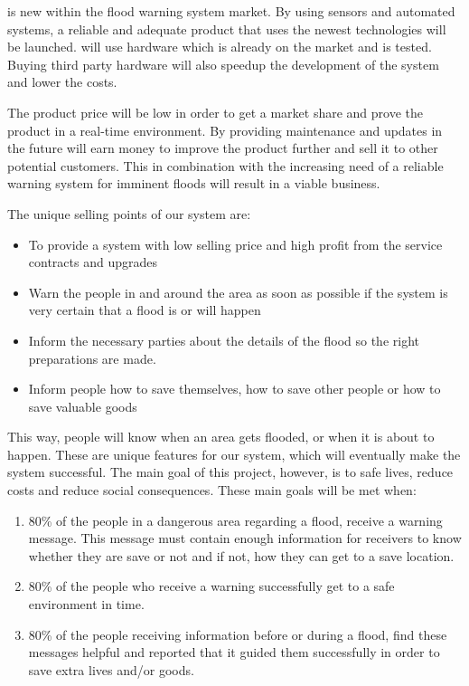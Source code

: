 \CompanyName{} is new within the flood warning system market. By using sensors and automated systems, a reliable and adequate product that uses the newest technologies will be launched. \CompanyName{} will use hardware which is already on the market and is tested. Buying third party hardware will also speedup the development of the system and lower the costs.

The product price will be low in order to get a market share and prove the product in a real-time environment. By providing maintenance and updates in the future \CompanyName{} will earn money to improve the product further and sell it to other potential customers. This in combination with the increasing need of a reliable warning system for imminent floods will result in a viable business.


The unique selling points of our system are: 
\begin{itemize}
	\item To provide a system with low selling price and high profit from the service contracts and upgrades
	\item Warn the people in and around the area as soon as possible if the system is very certain that a flood is or will happen
	\item Inform the necessary parties about the details of the flood so the right preparations are made. 
	\item Inform people how to save themselves, how to save other people or how to save valuable goods
\end{itemize}

This way, people will know when an area gets flooded, or when it is about to happen. 
These are unique features for our system, which will eventually make the system successful. The main goal of this project, however, is to safe lives, reduce costs and reduce social consequences. These main goals will be met when:
\begin{enumerate}
	\item 80\% of the people in a dangerous area regarding a flood, receive a warning message. This message must contain enough information for receivers to know whether they are save or not and if not, how they can get to a save location.
	\item 80\% of the people who receive a warning successfully get to a safe environment in time.
	\item 80\% of the people receiving information before or during a flood, find these messages helpful and reported that it guided them successfully in order to save extra lives and/or goods.
\end{enumerate}

